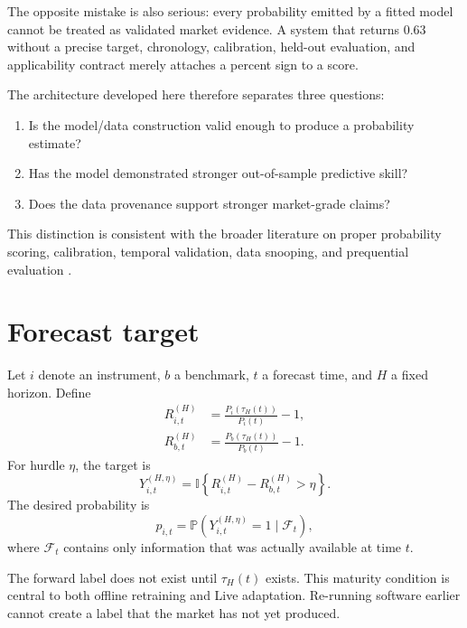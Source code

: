 \documentclass[11pt]{article}
\newcommand{\Prb}{\mathbb{P}}
\newcommand{\I}{\mathbb{I}}
\begin{document}
The opposite mistake is also serious: every probability emitted by a fitted model cannot be treated as validated market evidence. A system that returns $0.63$ without a precise target, chronology, calibration, held-out evaluation, and applicability contract merely attaches a percent sign to a score.

The architecture developed here therefore separates three questions:
\begin{enumerate}[itemsep=0.2em]
\item Is the model/data construction valid enough to produce a probability estimate?
\item Has the model demonstrated stronger out-of-sample predictive skill?
\item Does the data provenance support stronger market-grade claims?
\end{enumerate}
This distinction is consistent with the broader literature on proper probability scoring, calibration, temporal validation, data snooping, and prequential evaluation \citep{brier1950verification,gneiting2007proper,gneiting2007calibration,white2000reality,dawid1984prequential}.

\section{Forecast target}
Let $i$ denote an instrument, $b$ a benchmark, $t$ a forecast time, and $H$ a fixed horizon. Define
\begin{align}
R_{i,t}^{(H)} &= \frac{P_i(\tau_H(t))}{P_i(t)}-1,\\
R_{b,t}^{(H)} &= \frac{P_b(\tau_H(t))}{P_b(t)}-1.
\end{align}
For hurdle $\eta$, the target is
\begin{equation}
Y_{i,t}^{(H,\eta)}=\I\left\{R_{i,t}^{(H)}-R_{b,t}^{(H)}>\eta\right\}.
\end{equation}
The desired probability is
\begin{equation}
p_{i,t}=\Prb\left(Y_{i,t}^{(H,\eta)}=1\mid\mathcal{F}_t\right),
\end{equation}
where $\mathcal{F}_t$ contains only information that was actually available at time $t$.

The forward label does not exist until $\tau_H(t)$ exists. This maturity condition is central to both offline retraining and Live adaptation. Re-running software earlier cannot create a label that the market has not yet produced.
\end{document}
